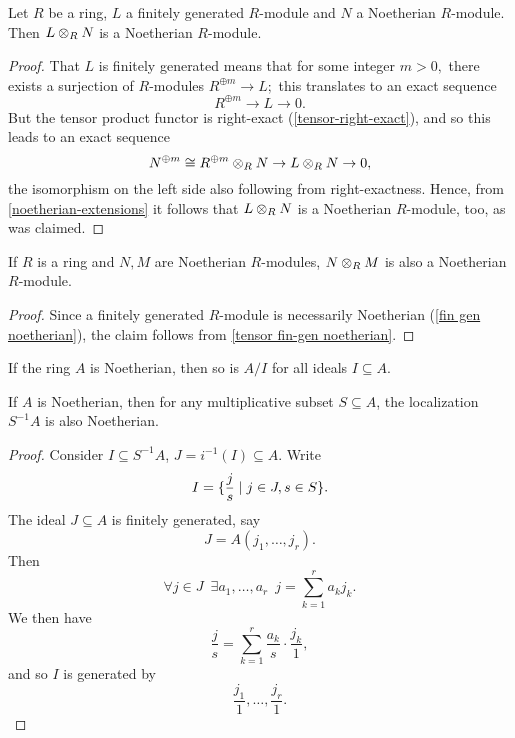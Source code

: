 \begin{prop}
  \label{tensor fin-gen noetherian}
  Let \(R\) be a ring, \(L\) a finitely generated \(R\)-module and \(N\) a Noetherian \(R\)-module. Then \(L \otimes_R N\) is a Noetherian \(R\)-module.
\end{prop}
\begin{proof}
  That \(L\) is finitely generated means that for some integer \(m > 0,\) there exists a surjection of \(R\)-modules \(R^{\oplus m} \to L;\) this translates to an exact sequence
  \[R^{\oplus m} \to L \to 0.\]
  But the tensor product functor is right-exact (\cref{tensor-right-exact}), and so this leads to an exact sequence
  \[N^{\oplus m} \cong R^{\oplus m} \otimes_R N \to L \otimes_R N \to 0,\]
  the isomorphism on the left side also following from right-exactness.
  Hence, from \cref{noetherian-extensions} it follows that \(L \otimes_R N\) is a Noetherian \(R\)-module, too, as was claimed.
\end{proof}

\begin{corollary}
  If \(R\) is a ring and \(N, M\) are Noetherian \(R\)-modules, \(N \otimes_R M\) is also a Noetherian \(R\)-module.
\end{corollary}
\begin{proof}
  Since a finitely generated \(R\)-module is necessarily Noetherian (\cref{fin gen noetherian}), the claim follows from \cref{tensor fin-gen noetherian}.
\end{proof}

\begin{lemma}
  If the ring $A$ is Noetherian, then so is $A/{I}$ for all ideals $I \subseteq A$.
\end{lemma}

\begin{lemma}
  If $A$ is Noetherian, then for any multiplicative subset $S \subseteq A$, the localization $S^{-1}A$ is also Noetherian.
\end{lemma}
\begin{proof}
  Consider $I \subseteq S^{-1}A$, $J = i^{-1}(I) \subseteq A$.
  Write
  \[ I = \{ \frac{j}{s} \mathrel{|} j \in J, s \in S \}.\]
  The ideal $J \subseteq A$ is finitely generated, say
  \[ J = A(j_1, \dotsc, j_r).\]
  Then
  \[ \forall j \in J \enspace \exists a_1, \dotsc, a_r \enspace j = \sum_{k=1}^r a_k j_k.\]
  We then have
  \[ \frac{j}{s} = \sum_{k=1}^r \frac{a_k}{s} \cdot \frac{j_k}{1},\]
  and so $I$ is generated by
  \[ \frac{j_1}{1}, \dotsc, \frac{j_r}{1}.\]
\end{proof}

